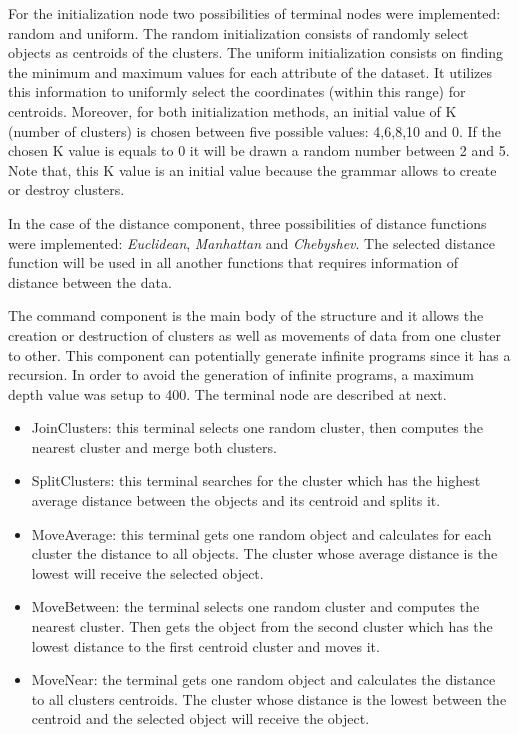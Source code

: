 \documentclass[journal]{IEEEtran}
\begin{document}
	For the initialization node two possibilities of terminal nodes were implemented: random and uniform. The random initialization consists of randomly select objects as centroids of the clusters. The uniform initialization consists on finding the minimum and maximum values for each attribute of the dataset. It utilizes this information to uniformly select the coordinates (within this range) for centroids. Moreover, for both initialization methods, an initial value of K (number of clusters) is chosen between five possible values: 4,6,8,10 and 0. If the chosen K value is equals to 0 it will be drawn a random number between 2 and 5. Note that, this K value is an initial value because the grammar allows to create or destroy clusters. 
	
	In the case of the distance component, three possibilities of distance functions were implemented: \textit{Euclidean}, \textit{Manhattan} and \textit{Chebyshev}. The selected distance function will be used in all another functions that requires information of distance between the data. 
	
	The command component is the main body of the structure and it allows the creation or destruction of clusters as well as movements of data from one cluster to other.  This component can potentially generate infinite programs since it has a recursion. In order to avoid the generation of infinite programs, a maximum depth value was setup to 400. The  terminal node are described at next.
	
	\begin{itemize}
		\item JoinClusters: this terminal selects one random cluster, then computes the nearest cluster and merge both clusters.
		\item SplitClusters: this terminal searches for the cluster which has the highest average distance between the objects and its centroid and splits it. 
		\item MoveAverage:  this terminal gets one random object and calculates for each cluster the distance to all objects. The cluster whose average distance is the lowest will receive the 
		selected object.
		\item MoveBetween: the terminal selects one random cluster and computes the nearest cluster. Then gets the object from the second cluster which has the lowest distance to the first centroid cluster and moves it.
		\item MoveNear:  the terminal gets one random object and calculates the distance to all clusters centroids. The cluster whose distance is the lowest between the centroid and the selected object will receive the object.
	\end{itemize}
	
\end{document}
